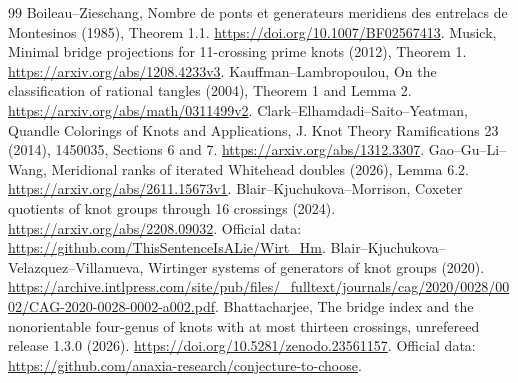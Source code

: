 \documentclass[11pt]{article}
\begin{document}
\begin{thebibliography}{99}
 Boileau--Zieschang, Nombre de ponts et generateurs meridiens
des entrelacs de Montesinos (1985), Theorem 1.1.
\url{https://doi.org/10.1007/BF02567413}.
 Musick, Minimal bridge projections for 11-crossing
prime knots (2012), Theorem 1. \url{https://arxiv.org/abs/1208.4233v3}.
 Kauffman--Lambropoulou, On the classification of rational
tangles (2004), Theorem 1 and Lemma 2.
\url{https://arxiv.org/abs/math/0311499v2}.
 Clark--Elhamdadi--Saito--Yeatman, Quandle Colorings of
Knots and Applications, J. Knot Theory Ramifications 23 (2014), 1450035,
Sections 6 and 7. \url{https://arxiv.org/abs/1312.3307}.
 Gao--Gu--Li--Wang, Meridional ranks of iterated Whitehead
doubles (2026), Lemma 6.2. \url{https://arxiv.org/abs/2611.15673v1}.
 Blair--Kjuchukova--Morrison, Coxeter quotients of knot
groups through 16 crossings (2024).
\url{https://arxiv.org/abs/2208.09032}.
Official data: \url{https://github.com/ThisSentenceIsALie/Wirt_Hm}.
 Blair--Kjuchukova--Velazquez--Villanueva, Wirtinger
systems of generators of knot groups (2020).
\url{https://archive.intlpress.com/site/pub/files/_fulltext/journals/cag/2020/0028/0002/CAG-2020-0028-0002-a002.pdf}.
 Bhattacharjee, The bridge index and the nonorientable
four-genus of knots with at most thirteen crossings, unrefereed release
1.3.0 (2026). \url{https://doi.org/10.5281/zenodo.23561157}.
Official data: \url{https://github.com/anaxia-research/conjecture-to-choose}.
\end{thebibliography}
\end{document}
